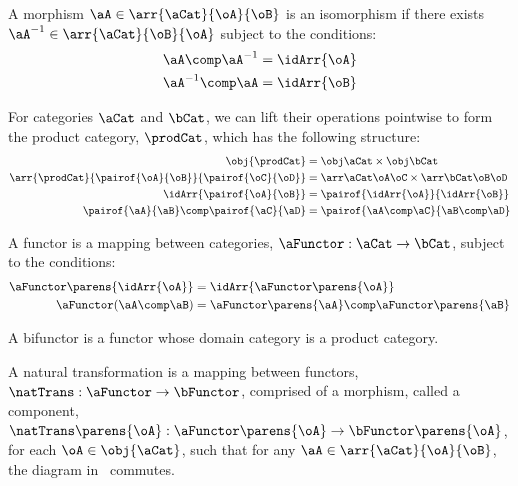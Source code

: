 \begin{definition}[Isomorphisms]
    A morphism $\aA \in \arr{\aCat}{\oA}{\oB}$ is an isomorphism
    if there exists $\aA^{-1} \in \arr{\aCat}{\oB}{\oA}$ subject
    to the conditions:
    \begin{align*}
        \aA \comp \aA^{-1} &= \idArr{\oA}\\
        \aA^{-1} \comp \aA &= \idArr{\oB}
    \end{align*}
\end{definition}

\begin{definition}
    For categories $\aCat$ and $\bCat$, we can lift their operations pointwise
    to form the product category, $\prodCat$, which has the following
    structure:
    \begin{align*}
        \obj{\prodCat} &= \obj\aCat \times \obj\bCat\\
        \arr{\prodCat}{\pairof{\oA}{\oB}}{\pairof{\oC}{\oD}}
        &= \arr\aCat\oA\oC \times \arr\bCat\oB\oD\\
        \idArr{\pairof{\oA}{\oB}} &=
        \pairof{\idArr{\oA}}{\idArr{\oB}} \\
        \pairof{\aA}{\aB} \comp \pairof{\aC}{\aD} &=
        \pairof{\aA \comp \aC}{\aB \comp \aD}
    \end{align*}
\end{definition}

\begin{definition}[Functor]
    A functor is a mapping between categories, $\aFunctor : \aCat \to \bCat$,
    subject to the conditions:
    \begin{align*}
        \aFunctor\parens{\idArr{\oA}} &=
        \idArr{\aFunctor\parens{\oA}}\\
        \aFunctor(\aA \comp \aB) &= \aFunctor\parens{\aA} \comp
        \aFunctor\parens{\aB}
    \end{align*}
\end{definition}

\begin{definition}[Bifunctor]
    A bifunctor is a functor whose domain category is a product category.
\end{definition}

\begin{definition}
A natural transformation is a mapping between functors, $\natTrans : \aFunctor \to \bFunctor$,
comprised of a morphism, called a component, $\natTrans\parens{\oA} : \aFunctor\parens{\oA} \to
\bFunctor\parens{\oA} $, for each $\oA \in \obj{\aCat}$, such that for any $\aA \in
\arr{\aCat}{\oA}{\oB}$, the diagram in~ commutes.
\end{definition}

